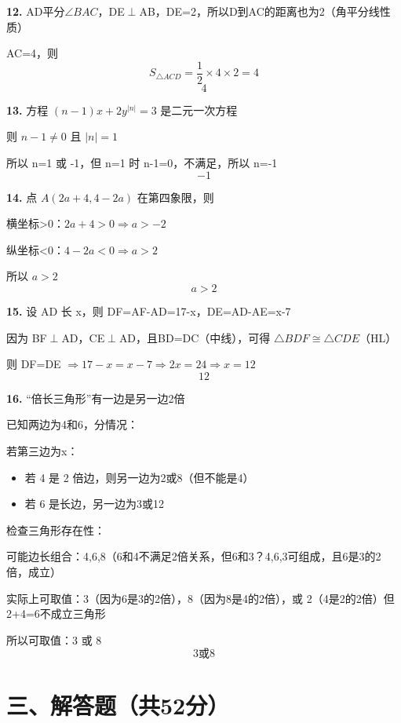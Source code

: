 \bigskip

\textbf{12.} AD平分\(\angle BAC\)，DE\(\perp\)AB，DE=2，所以D到AC的距离也为2（角平分线性质）

AC=4，则
\[
S_{\triangle ACD} = \frac12 \times 4 \times 2 = 4
\]
\[
\boxed{4}
\]

\bigskip

\textbf{13.} 方程 \((n-1)x + 2y^{|n|} = 3\) 是二元一次方程

则 \(n-1 \neq 0\) 且 \(|n|=1\)

所以 n=1 或 -1，但 n=1 时 n-1=0，不满足，所以 n=-1
\[
\boxed{-1}
\]

\bigskip

\textbf{14.} 点 \(A(2a+4, 4-2a)\) 在第四象限，则

横坐标>0：\(2a+4>0 \Rightarrow a>-2\)

纵坐标<0：\(4-2a<0 \Rightarrow a>2\)

所以 \(a>2\)
\[
\boxed{a > 2}
\]

\bigskip

\textbf{15.} 设 AD 长 x，则 DF=AF-AD=17-x，DE=AD-AE=x-7

因为 BF\(\perp\)AD，CE\(\perp\)AD，且BD=DC（中线），可得 \(\triangle BDF \cong \triangle CDE\)（HL）

则 DF=DE \(\Rightarrow 17-x = x-7 \Rightarrow 2x = 24 \Rightarrow x=12\)
\[
\boxed{12}
\]

\bigskip

\textbf{16.} “倍长三角形”有一边是另一边2倍

已知两边为4和6，分情况：

若第三边为x：

\begin{itemize}
\item 若 4 是 2 倍边，则另一边为2或8（但不能是4）
\item 若 6 是长边，另一边为3或12
\end{itemize}

检查三角形存在性：

可能边长组合：4,6,8（6和4不满足2倍关系，但6和3？4,6,3可组成，且6是3的2倍，成立）

实际上可取值：3（因为6是3的2倍），8（因为8是4的2倍），或 2（4是2的2倍）但2+4=6不成立三角形

所以可取值：3 或 8
\[
\boxed{3\text{或}8}
\]

\section*{三、解答题（共52分）}

